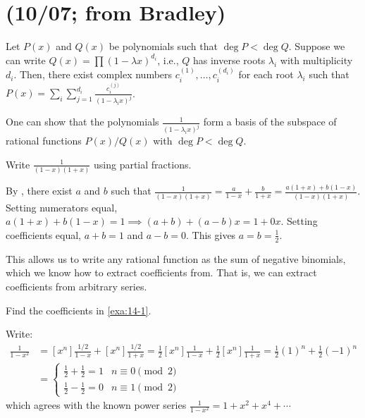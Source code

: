 \section{(10/07; from Bradley)}
\begin{theorem}[4.12]\label{thm:pf}
  Let $P(x)$ and $Q(x)$ be polynomials such that $\deg P < \deg Q$.
  Suppose we can write $Q(x) = \prod(1-\lambda x)^{d_i}$, i.e.,
  $Q$ has inverse roots $\lambda_i$ with multiplicity $d_i$.
  Then, there exist complex numbers $c_i^{(1)}, \dotsc, c_i^{(d_i)}$ for each root $\lambda_i$
  such that $P(x) = \sum\limits_{i}\sum\limits_{j=1}^{d_i}\frac{c_i^{(j)}}{(1-\lambda_i x)^j}$.
\end{theorem}
\begin{prf}[sketch]
  One can show that the polynomials $\frac{1}{(1-\lambda_i x)^j}$
  form a basis of the subspace of rational functions $P(x)/Q(x)$ with $\deg P < \deg Q$.
\end{prf}

\begin{example}\label{exa:14-1}
  Write $\frac{1}{(1-x)(1+x)}$ using partial fractions.
\end{example}
\begin{sol}
  By , there exist $a$ and $b$ such that
  $\frac{1}{(1-x)(1+x)} = \frac{a}{1-x} + \frac{b}{1+x} = \frac{a(1+x) + b(1-x)}{(1-x)(1+x)}$.
  Setting numerators equal, $a(1+x) + b(1-x) = 1 \implies (a+b) + (a-b)x = 1 + 0x$.
  Setting coefficients equal, $a+b = 1$ and $a-b = 0$.
  This gives $a = b = \frac12$.
\end{sol}

This allows us to write any rational function as the sum of negative binomials,
which we know how to extract coefficients from.
That is, we can extract coefficients from arbitrary series.

\begin{example}
  Find the coefficients in \cref{exa:14-1}.
\end{example}
\begin{sol}
  Write:
  \begin{align*}
    [x^n]\frac{1}{1-x^2}
     & = [x^n]\frac{1/2}{1-x} + [x^n]\frac{1/2}{1+x}
    = \frac12[x^n]\frac{1}{1-x} + \frac12[x^n]\frac{1}{1+x}
    = \frac12(1)^n + \frac12(-1)^n                   \\
     & = \begin{cases}
           \frac12+\frac12 = 1 & n \equiv 0 \pmod 2 \\
           \frac12-\frac12 = 0 & n \equiv 1 \pmod 2
         \end{cases}
  \end{align*}
  which agrees with the known power series $\frac{1}{1-x^2} = 1+x^2+x^4+\dotsb$
\end{sol}

